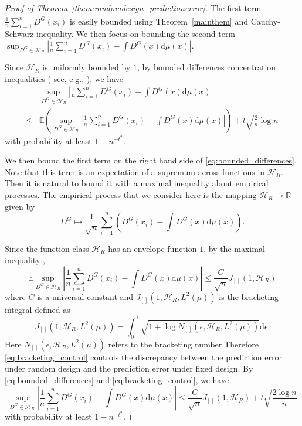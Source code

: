 \documentclass[11pt]{article}
\numberwithin{equation}{section}
\newcommand{\RS}{\mathbb{R}}
\newcommand{\Expt}{\mathbb{E}} %
\newcommand{\diff}{\mathrm{d}} %
\begin{document}
\begin{appendices}
\begin{proof}[Proof of Theorem~\ref{them:randomdesign_predictionerror}]
The first term $\displaystyle \frac{1}{n} \sum_{i=1}^nD^{\tilde{G}}(x_i)$ is easily bounded using Theorem~\ref{mainthem} and Cauchy-Schwarz inequality. We then focus on bounding the second term $\displaystyle \sup_{D^G \in \mathcal{H}_R} \left| \frac{1}{n} \sum_{i=1}^n D^G(x_i) - \int D^G(x) \mathrm{d} \mu(x)\right|$.


Since $\mathcal{H}_R$ is uniformly bounded by $1$, by bounded differences concentration inequalities ( see, e.g., \citet[Theorem 6.2]{boucheron2013concentration}), we have
\begin{equation}
\begin{split}
&\sup_{D^G \in \mathcal{H}_R} \left| \frac{1}{n} \sum_{i=1}^n D^G(x_i) - \int D^G(x) \mathrm{d} \mu(x)\right|\\
 \leq & \Expt \left( \sup_{D^G \in \mathcal{H}_R} \left| \frac{1}{n} \sum_{i=1}^n D^G(x_i) - \int D^G(x) \mathrm{d} \mu(x)\right|\right) + t \sqrt{\frac{2}{n} \log n}
\end{split}
\label{eq:bounded_differences}
\end{equation}
with probability at least $1-n^{-t^2}$.

We then bound the first term  on the right hand side of \eqref{eq:bounded_differences}.  Note that this term is an expectation of a supremum across functions in $\mathcal{H}_R$. Then it is natural to bound it with a maximal inequality about empirical processes. The empirical process that we consider here is the mapping $\mathcal{H}_R \rightarrow \RS$ given by
\[
D^G  \mapsto \frac{1}{\sqrt{n}} \sum_{i=1}^n \left(D^G(x_i) - \int D^G(x) \diff \mu(x) \right).
\]

Since the function class $\mathcal{H}_R$ has an envelope function $1$, by the maximal inequality \citep[Lemma 19.34 and Corollary 19.35]{van2000asymptotic},
\begin{equation}
\Expt \sup_{D^G \in \mathcal{H}_R} \left| \frac{1}{n} \sum_{i=1}^n D^G(x_i) -\int D^G(x) \mathrm{d} \mu(x)\right| \leq \frac{C}{\sqrt{n}} J_{[]} (1,\mathcal{H}_R)
\label{eq:bracketing_control}
\end{equation}
where $C$ is a universal constant and $J_{[]}(1,\mathcal{H}_R,L^2(\mu))$ is the bracketing integral defined as
\begin{equation}
J_{[]}(1,\mathcal{H}_R,L^2(\mu))= \int_{0}^1 \sqrt{1 + \log N_{[]}(\epsilon, \mathcal{H}_R, L^2(\mu))} \mathrm{d} \epsilon.
\label{eq:bracketing_integral}
\end{equation}
Here $N_{[]}(\epsilon, \mathcal{H}_R, L^2(\mu))$ refers to the bracketing number.Therefore \eqref{eq:bracketing_control} controls the discrepancy between the prediction error under random design and the prediction error under fixed design. 
By \eqref{eq:bounded_differences} and \eqref{eq:bracketing_control}, we have
\begin{equation}
\sup_{D^G \in \mathcal{H}_R} \left| \frac{1}{n} \sum_{i=1}^n D^G(x_i) - \int D^G(x) \mathrm{d} \mu(x)\right| \leq  \frac{C}{\sqrt{n}}J_{[]} (1,\mathcal{H}_R) + t\sqrt{\frac{2\log n}{n}}
\label{eq:bdi_bc}
\end{equation}
with probability at least $1- n^{-t^2}$.


\end{proof}
\end{appendices}
\end{document}
